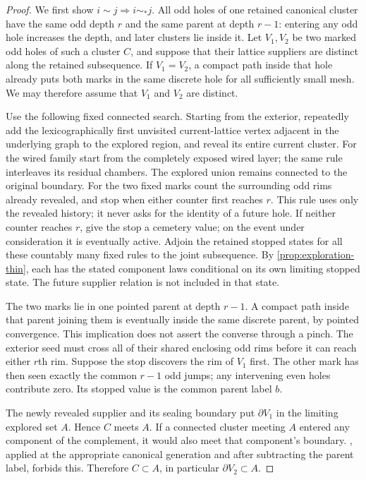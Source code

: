 \begin{proof}
We first show \(i\sim j\Rightarrow i\sim_*j\). All odd holes of one
retained canonical cluster have the same odd depth \(r\) and the same
parent at depth \(r-1\): entering any odd hole increases the depth, and
later clusters lie inside it. Let \(V_1,V_2\) be two marked odd holes
of such a cluster \(C\), and suppose that their lattice suppliers are
distinct along the retained subsequence.
If \(V_1=V_2\), a compact path inside that hole already puts both
marks in the same discrete hole for all sufficiently small mesh.
We may therefore assume that \(V_1\) and \(V_2\) are distinct.

Use the following fixed connected search. Starting from the exterior,
repeatedly add the lexicographically first unvisited current-lattice
vertex adjacent in the underlying graph to the explored region, and
reveal its entire current cluster. For the wired family start from the
completely exposed wired layer; the same rule interleaves its residual
chambers. The explored union remains connected to the original boundary.
For the two fixed marks count the surrounding odd rims already revealed,
and stop when either counter first reaches \(r\). This rule uses only the
revealed history; it never asks for the identity of a future hole.
If neither counter reaches \(r\), give the stop a cemetery value;
on the event under consideration it is eventually active.
Adjoin the retained stopped states for all these countably many fixed
rules to the joint subsequence. By \cref{prop:exploration-thin}, each
has the stated component laws conditional on its own limiting stopped
state. The future supplier relation is not included in that state.

The two marks lie in one pointed parent at depth \(r-1\). A compact
path inside that parent joining them is eventually inside the same
discrete parent, by pointed convergence. This implication does not
assert the converse through a pinch. The exterior seed must cross
all of their shared enclosing odd rims before it can reach either
\(r\)th rim. Suppose the stop discovers the rim of \(V_1\) first.
The other mark has then seen exactly the common \(r-1\) odd jumps;
any intervening even holes contribute zero. Its stopped value is the
common parent label \(b\).

The newly revealed supplier and its sealing boundary put
\(\partial V_1\) in the limiting explored set \(A\). Hence \(C\)
meets \(A\). If a connected cluster meeting \(A\) entered any component
of the complement, it would also meet that component's boundary.
, applied at the appropriate canonical
generation and after subtracting the parent label, forbids this.
Therefore \(C\subset A\), in particular \(\partial V_2\subset A\).


\end{proof}
